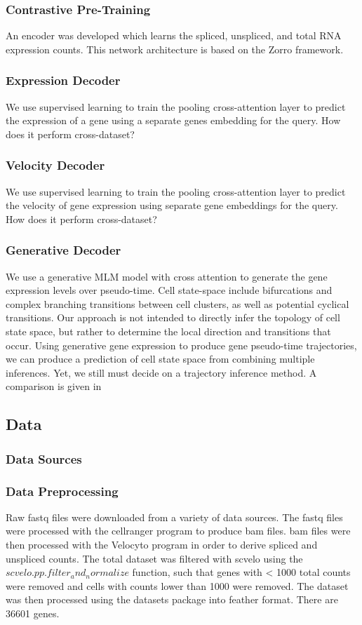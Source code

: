 \documentclass{article} %
\begin{document}
 \subsubsection{Contrastive Pre-Training}
An encoder was developed which learns the spliced, unspliced, and total RNA expression counts. This network architecture is based on the Zorro framework. 
\subsubsection{Expression Decoder}
We use supervised learning to train the pooling cross-attention layer to predict the expression of a gene using a separate genes embedding for the query. How does it perform cross-dataset?
\subsubsection{Velocity Decoder}
We use supervised learning to train the pooling cross-attention layer to predict the velocity of gene expression using separate gene embeddings for the query. How does it perform cross-dataset?
\subsubsection{Generative Decoder}
We use a generative MLM model with cross attention to generate the gene expression levels over pseudo-time.
Cell state-space include bifurcations and complex branching transitions between cell clusters, as well as potential cyclical transitions. \cite{van2020trajectory} Our approach is not intended to directly infer the topology of cell state space, but rather to determine the local direction and transitions that occur. Using generative gene expression to produce gene pseudo-time trajectories, we can produce a prediction of cell state space from combining multiple inferences.
Yet, we still must decide on a trajectory inference method. A comparison is given in
\cite{saelens2019comparison}
  \subsection{Data}
  \subsubsection{Data Sources}
  \subsubsection{Data Preprocessing}
Raw fastq files were downloaded from a variety of data sources. The fastq files were processed with the cellranger program to produce bam files. bam files were then processed with the Velocyto program in order to derive spliced and unspliced counts. The total dataset was filtered with scvelo using the $scvelo.pp.filter_and_normalize$ function, such that genes with < 1000 total counts were removed and cells with counts lower than 1000 were removed. The dataset was then processed using the datasets package into feather format. There are 36601 genes.
\end{document}
